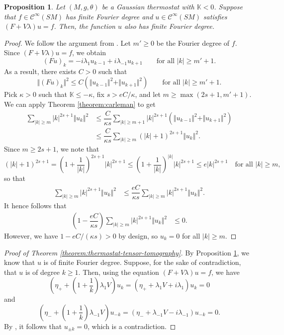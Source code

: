\documentclass[reqno,12pt,letterpaper]{amsart}
\newtheorem{proposition}{Proposition}[section]
\theoremstyle{definition}
\theoremstyle{remark}
\theoremstyle{definition}
\numberwithin{equation}{section}
\begin{document}
\begin{proposition}\label{theorem:finite-implies-finite}
Let $(M, g, \theta)$ be a Gaussian thermostat with $\mathbb{K}<0$. Suppose that $f\in \mathcal{C}^\infty(SM)$ has finite Fourier degree and $u\in \mathcal{C}^\infty(SM)$ satisfies $(F+V\lambda)u=f$. Then, the function $u$ also has finite Fourier degree. 
\end{proposition}
\begin{proof}
We follow the argument from \cite[Theorem 5.1]{assylbekov21}. Let $m'\geq 0$ be the Fourier degree of $f$. Since $(F+V\lambda)u=f$, we obtain
$$(Fu)_k=-i\lambda_{1}u_{k-1}+i\lambda_{-1}u_{k+1} \qquad \text{for all } |k|\geq m'+1.$$
As a result, there exists $C>0$ such that
$$\Vert(Fu)_k \Vert^2\leq C(\Vert u_{k-1}\Vert^2+\Vert u_{k+1}\Vert^2) \qquad \text{for all } |k|\geq m'+1.$$
Pick $\kappa>0$ such that $\mathbb{K}\leq -\kappa$, fix $s>eC/\kappa$, and let $m\geq \max(2s+1, m'+1)$. We can apply Theorem \ref{theorem:carleman} to get
\begin{equation*}
\begin{alignedat}{1}
\sum_{|k|\geq m} |k|^{2s+1}\Vert u_k\Vert^2 &\leq \dfrac{C}{\kappa s}\sum_{|k|\geq m+1}|k|^{2s+1}(\Vert u_{k-1}\Vert^2 +\Vert u_{k+1}\Vert^2)\\
&\leq \dfrac{C}{\kappa s}\sum_{|k|\geq m}(|k|+1)^{2s+1} \Vert u_{k}\Vert^2.
\end{alignedat}
\end{equation*}
Since $m\geq 2s+1$, we note that
$$(|k|+1)^{2s+1}=\left(1+\dfrac{1}{|k|}\right)^{2s+1}|k|^{2s+1}\leq \left(1+\dfrac{1}{|k|}\right)^{|k|}|k|^{2s+1}\leq e |k|^{2s+1}\quad \text{for all } |k| \geq m,$$
so that
\begin{equation*}
\begin{alignedat}{1}
\sum_{|k|\geq m} |k|^{2s+1}\Vert u_k\Vert^2 
&\leq \dfrac{eC}{\kappa s}\sum_{|k|\geq m}|k|^{2s+1} \Vert u_{k}\Vert^2.
\end{alignedat}
\end{equation*}
It hence follows that
\begin{equation*}
\begin{alignedat}{1}
\left(1-\dfrac{eC}{\kappa s}\right)\sum_{|k|\geq m} |k|^{2s+1}\Vert u_k\Vert^2 
&\leq 0.
\end{alignedat}
\end{equation*}
However, we have $1-eC/(\kappa s)>0$ by design, so $u_k=0$ for all $|k|\geq m$. 
\end{proof}

\begin{proof}[Proof of Theorem \ref{theorem:thermostat-tensor-tomography}]
By Proposition \ref{theorem:finite-implies-finite}, we know that $u$ is of finite Fourier degree. Suppose, for the sake of contradiction, that $u$ is of degree $k\geq 1$. Then, using the equation $(F+V\lambda)u=f$, we have
$$\left(\eta_+ +\left(1+\dfrac{1}{k}\right)\lambda_1V\right)u_k=(\eta_+ + \lambda_1 V + i\lambda_1)u_k = 0$$
and 
$$\left(\eta_- +\left(1+\dfrac{1}{k}\right)\lambda_{-1}V\right)u_{-k}=(\eta_- + \lambda_{-1} V -i\lambda_{-1})u_{-k} = 0.$$
By \cite[Proposition 6.1]{assylbekov17}, it follows that $u_{\pm k}=0$, which is a contradiction.%
\end{proof}
\end{document}
